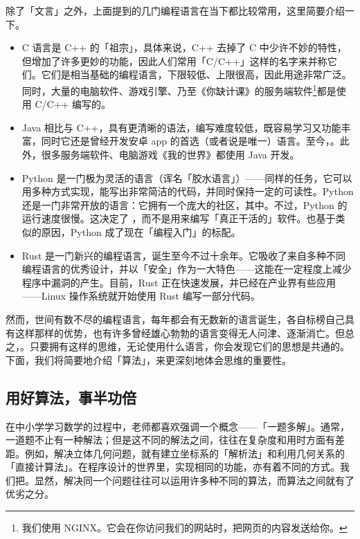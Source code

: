除了「文言」之外，上面提到的几门编程语言在当下都比较常用，这里简要介绍一下。

\begin{itemize}
  \item C 语言是 C++ 的「祖宗」，具体来说，C++ 去掉了 C 中少许不妙的特性，但增加了许多更妙的功能，因此人们常用「C/C++」这样的名字来并称它们。它们是相当基础的编程语言，下限较低、上限很高，因此用途非常广泛。同时，大量的电脑软件、游戏引擎、乃至《你缺计课》的服务端软件\footnote{我们使用 NGINX。它会在你访问我们的网站时，把网页的内容发送给你。}都是使用 C/C++ 编写的。
  \item Java 相比与 C++，具有更清晰的语法，编写难度较低，既容易学习又功能丰富，同时它还是曾经开发安卓 app 的首选（或者说是唯一）语言。至今，。此外，很多服务端软件、电脑游戏《我的世界》都使用 Java 开发。
  \item Python 是一门极为灵活的语言（诨名「胶水语言」）——同样的任务，它可以用多种方式实现，能写出非常简洁的代码，并同时保持一定的可读性。Python 还是一门非常开放的语言：它拥有一个庞大的社区，其中。不过，Python 的运行速度很慢。这决定了 ，而不是用来编写「真正干活的」软件。也基于类似的原因，Python 成了现在「编程入门」的标配。
  \item Rust 是一门新兴的编程语言，诞生至今不过十余年。它吸收了来自多种不同编程语言的优秀设计，并以「安全」作为一大特色——这能在一定程度上减少程序中漏洞的产生。目前，Rust 正在快速发展，并已经在产业界有些应用——Linux 操作系统就开始使用 Rust 编写一部分代码。
\end{itemize}

然而，世间有数不尽的编程语言，每年都会有无数新的语言诞生，各自标榜自己具有这样那样的优势，也有许多曾经雄心勃勃的语言变得无人问津、逐渐消亡。但总之，。只要拥有这样的思维，无论使用什么语言，你会发现它们的思想是共通的。下面，我们将简要地介绍「算法」，来更深刻地体会思维的重要性。

\subsection{用好算法，事半功倍}

在中小学学习数学的过程中，老师都喜欢强调一个概念——「一题多解」。通常，一道题不止有一种解法；但是这不同的解法之间，往往在复杂度和用时方面有差距。例如，解决立体几何问题，就有建立坐标系的「解析法」和利用几何关系的「直接计算法」。在程序设计的世界里，实现相同的功能，亦有着不同的方式。我们把。显然，解决同一个问题往往可以运用许多种不同的算法，而算法之间就有了优劣之分。

